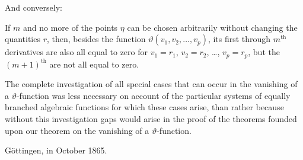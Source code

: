 \documentclass{article}
\begin{document}
And conversely:

If $m$ and no more of the points $\eta$ can be chosen arbitrarily without changing the quantities $r$, then, besides the function $\vartheta(v_1, v_2, \dots, v_p)$, its first through $m^{\text{th}}$ derivatives are also all equal to zero for $v_1 = r_1$, $v_2 = r_2$, \dots, $v_p = r_p$, but the $(m+1)^{\text{th}}$ are not all equal to zero.

The complete investigation of all special cases that can occur in the vanishing of a $\vartheta$-function was less necessary on account of the particular systems of equally branched algebraic functions for which these cases arise, than rather because without this investigation gaps would arise in the proof of the theorems founded upon our theorem on the vanishing of a $\vartheta$-function.

Göttingen, in October 1865.
\end{document}
